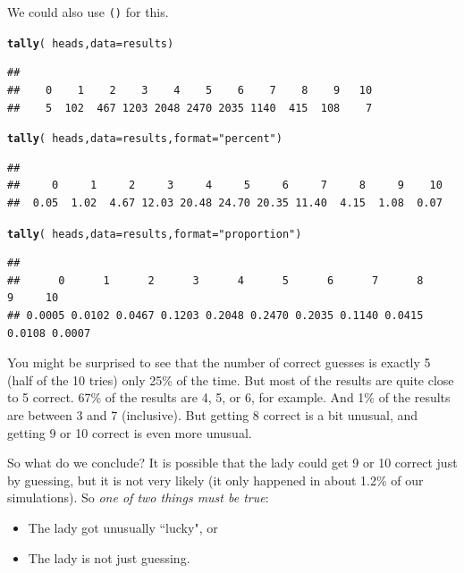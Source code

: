 \documentclass[twoside]{book}
\makeatletter
\newcommand{\hlstr}[1]{\textcolor[rgb]{0.192,0.494,0.8}{#1}}%
\newcommand{\hlopt}[1]{\textcolor[rgb]{0,0,0}{#1}}%
\newcommand{\hlstd}[1]{\textcolor[rgb]{0.345,0.345,0.345}{#1}}%
\newcommand{\hlkwc}[1]{\textcolor[rgb]{0.333,0.667,0.333}{#1}}%
\newcommand{\hlkwd}[1]{\textcolor[rgb]{0.737,0.353,0.396}{\textbf{#1}}}%
\newenvironment{kframe}{%
 \def\at@end@of@kframe{}%
 \ifinner\ifhmode%
  \def\at@end@of@kframe{\end{minipage}}%
  \begin{minipage}{\columnwidth}%
 \fi\fi%
 \def\FrameCommand##1{\hskip\@totalleftmargin \hskip-\fboxsep
 \colorbox{shadecolor}{##1}\hskip-\fboxsep
     \hskip-\linewidth \hskip-\@totalleftmargin \hskip\columnwidth}%
 \MakeFramed {\advance\hsize-\width
   \@totalleftmargin\z@ \linewidth\hsize
   \@setminipage}}%
 {\par\unskip\endMakeFramed%
 \at@end@of@kframe}
\newenvironment{knitrout}{}{} %
\newcommand{\Rindex}[1]{\index{\texttt{#1}}}
\newcommand{\function}[1]{{\color{purple!75!blue}\texttt{\StrSubstitute{#1}{()}{}()}}\Rindex{#1}}
\newcounter{example}[section]
\makeatother
\begin{document}
We could also use \function{tally()} for this.
\begin{knitrout}
\color{fgcolor}\begin{kframe}
\begin{alltt}
\hlkwd{tally}\hlstd{(}\hlopt{~}\hlstd{heads,} \hlkwc{data} \hlstd{= results)}
\end{alltt}
\begin{verbatim}
## 
##    0    1    2    3    4    5    6    7    8    9   10 
##    5  102  467 1203 2048 2470 2035 1140  415  108    7
\end{verbatim}
\begin{alltt}
\hlkwd{tally}\hlstd{(}\hlopt{~}\hlstd{heads,} \hlkwc{data} \hlstd{= results,} \hlkwc{format} \hlstd{=} \hlstr{"percent"}\hlstd{)}
\end{alltt}
\begin{verbatim}
## 
##     0     1     2     3     4     5     6     7     8     9    10 
##  0.05  1.02  4.67 12.03 20.48 24.70 20.35 11.40  4.15  1.08  0.07
\end{verbatim}
\begin{alltt}
\hlkwd{tally}\hlstd{(}\hlopt{~}\hlstd{heads,} \hlkwc{data} \hlstd{= results,} \hlkwc{format} \hlstd{=} \hlstr{"proportion"}\hlstd{)}
\end{alltt}
\begin{verbatim}
## 
##      0      1      2      3      4      5      6      7      8      9     10 
## 0.0005 0.0102 0.0467 0.1203 0.2048 0.2470 0.2035 0.1140 0.0415 0.0108 0.0007
\end{verbatim}
\end{kframe}
\end{knitrout}


You might be surprised to see that the number of correct guesses
is exactly 5 (half of the 10 tries) only 
25\%
of the time.  But most of the results are quite close to 5 correct.
67\% of the results are 
4, 5, or 6, for example.
And 1\% of the results 
are  between 3 and 7 (inclusive).
But getting 8 correct is a bit unusual, and getting 9 or 10 correct is even 
more unusual.  

So what do we conclude?  It is possible that the lady could get 9 or 10 correct
just by guessing, but it is not very likely (it only happened in about
1.2\% of our simulations). 
So \emph{one of two things must be true}:
\begin{itemize}
\item The lady got unusually ``lucky", or 
\item The lady is not just guessing.
\end{itemize}
\end{document}
